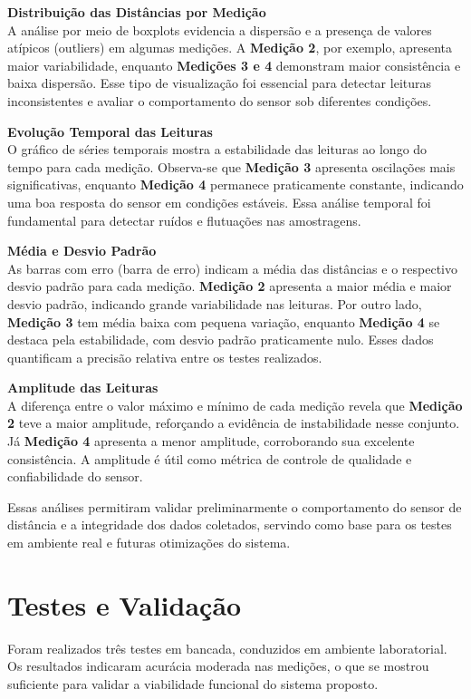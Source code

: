 \documentclass[10pt,conference]{IEEEtran}
\begin{document}
{\textbf{Distribuição das Distâncias por Medição} \\
A análise por meio de boxplots evidencia a dispersão e a presença de valores atípicos (outliers) em algumas medições. A \textbf{Medição 2}, por exemplo, apresenta maior variabilidade, enquanto \textbf{Medições 3 e 4} demonstram maior consistência e baixa dispersão. Esse tipo de visualização foi essencial para detectar leituras inconsistentes e avaliar o comportamento do sensor sob diferentes condições.

\vspace{0.3cm}
\textbf{Evolução Temporal das Leituras} \\
O gráfico de séries temporais mostra a estabilidade das leituras ao longo do tempo para cada medição. Observa-se que \textbf{Medição 3} apresenta oscilações mais significativas, enquanto \textbf{Medição 4} permanece praticamente constante, indicando uma boa resposta do sensor em condições estáveis. Essa análise temporal foi fundamental para detectar ruídos e flutuações nas amostragens.

\vspace{0.3cm}
\textbf{Média e Desvio Padrão} \\
As barras com erro (barra de erro) indicam a média das distâncias e o respectivo desvio padrão para cada medição. \textbf{Medição 2} apresenta a maior média e maior desvio padrão, indicando grande variabilidade nas leituras. Por outro lado, \textbf{Medição 3} tem média baixa com pequena variação, enquanto \textbf{Medição 4} se destaca pela estabilidade, com desvio padrão praticamente nulo. Esses dados quantificam a precisão relativa entre os testes realizados.

\vspace{0.3cm}
\textbf{Amplitude das Leituras} \\
A diferença entre o valor máximo e mínimo de cada medição revela que \textbf{Medição 2} teve a maior amplitude, reforçando a evidência de instabilidade nesse conjunto. Já \textbf{Medição 4} apresenta a menor amplitude, corroborando sua excelente consistência. A amplitude é útil como métrica de controle de qualidade e confiabilidade do sensor.

Essas análises permitiram validar preliminarmente o comportamento do sensor de distância e a integridade dos dados coletados, servindo como base para os testes em ambiente real e futuras otimizações do sistema.

\section{Testes e Validação}
Foram realizados três testes em bancada, conduzidos em ambiente laboratorial. Os resultados indicaram acurácia moderada nas medições, o que se mostrou suficiente para validar a viabilidade funcional do sistema proposto.

}
\end{document}

